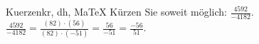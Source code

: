 \begin{MAufgabe}{Kuerzen}{kr, dh, MaTeX}
K\"urzen Sie soweit m\"oglich: $\frac{4592}{-4182}$.\\ 
\ifLsg\MLoesung
\quad $\frac{4592}{-4182}=\frac{(82)\cdot(56)}{(82)\cdot(-51)}=\frac{56}{-51}=\frac{-56}{51}$.\else\relax\fi
 \end{MAufgabe}